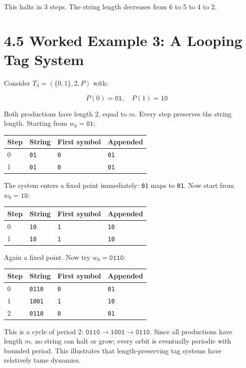 This halts in 3 steps. The string length decreases from 6 to 5 to 4 to 2.

\section{4.5 Worked Example 3: A Looping Tag System}

Consider $T_3 = (\{ 0, 1\} , 2, P)$ with:

\[
P(0) = \texttt{01}, \quad P(1) = \texttt{10}
\]

Both productions have length 2, equal to $m$. Every step preserves the string length. Starting from $w_0 = \texttt{01}$:

\begin{tabular}{|l|l|l|l|}
\hline
Step & String & First symbol & Appended \\
\hline
0 & \texttt{01} & \texttt{0} & \texttt{01} \\
1 & \texttt{01} & \texttt{0} & \texttt{01} \\
\hline
\end{tabular}


The system enters a fixed point immediately: \texttt{01} maps to \texttt{01}. Now start from $w_0 = \texttt{10}$:

\begin{tabular}{|l|l|l|l|}
\hline
Step & String & First symbol & Appended \\
\hline
0 & \texttt{10} & \texttt{1} & \texttt{10} \\
1 & \texttt{10} & \texttt{1} & \texttt{10} \\
\hline
\end{tabular}


Again a fixed point. Now try $w_0 = \texttt{0110}$:

\begin{tabular}{|l|l|l|l|}
\hline
Step & String & First symbol & Appended \\
\hline
0 & \texttt{0110} & \texttt{0} & \texttt{01} \\
1 & \texttt{1001} & \texttt{1} & \texttt{10} \\
2 & \texttt{0110} & \texttt{0} & \texttt{01} \\
\hline
\end{tabular}


This is a cycle of period 2: $\texttt{0110} \to \texttt{1001} \to \texttt{0110}$. Since all productions have length $m$, no string can halt or grow; every orbit is eventually periodic with bounded period. This illustrates that length-preserving tag systems have relatively tame dynamics.

